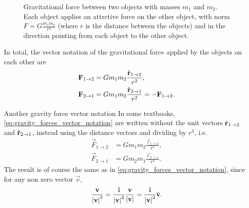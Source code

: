 \begin{figure}
	\begin{center}
	\end{center}
	\caption{Gravitational force between two objects with masses $m_{1}$ and $m_{2}$. Each object applies an attrctive force on the other object, with norm $F=G\frac{m_{1}m_{2}}{r^{2}}$ (where $r$ is the distance between the objects) and in the direction pointing from each object to the other object.}
	\label{fig:gravity_basics}
\end{figure}

In total, the vector notation of the gravitational force applied by the objects on each other are
\begin{align}
	\mathbf{F}_{1\to2} & = Gm_{1}m_{2}\frac{\hat{\mathbf{r}}_{1\to2}}{r^{2}}\nonumber,           \\
	\mathbf{F}_{2\to1} & = Gm_{1}m_{2}\frac{\hat{\mathbf{r}}_{2\to1}}{r^{2}} = -\mathbf{F}_{1\to2}.
	\label{eq:gravity_forces_vector_notation}
\end{align}

\begin{note}{Another gravity force vector notation}{}
	In some textbooks, \autoref{eq:gravity_forces_vector_notation} are written without the unit vectors $\hat{\mathbf{r}}_{1\to2}$ and $\hat{\mathbf{r}}_{2\to1}$, instead using the distance vectors and dividing by $r^{3}$, i.e.
	\begin{align*}
		\vec{F}_{1\to2} & = Gm_{1}m_{2}\frac{\vec{r}_{1\to2}}{r^{3}}, \\
		\vec{F}_{2\to1} & = Gm_{2}m_{1}\frac{\vec{r}_{2\to1}}{r^{3}}.
	\end{align*}
	The result is of course the same as in \autoref{eq:gravity_forces_vector_notation}, since for any non zero vector $\vec{v}$,
	\begin{align*}
		\frac{\mathbf{v}}{\left| \mathbf{v} \right|^{3}} = \frac{1}{\left| \mathbf{v} \right|^{2}}\frac{\mathbf{v}}{\left| \mathbf{v} \right|} = \frac{1}{\left| \mathbf{v} \right|^{2}}\hat{\mathbf{v}}.
	\end{align*}
\end{note}

